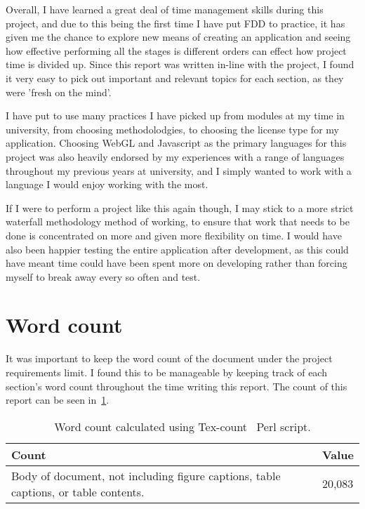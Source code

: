 Overall, I have learned a great deal of time management skills during this project, and due to this being the first time I have put FDD to practice, it has given me the chance to explore new means of creating an application and seeing how effective performing all the stages is different orders can effect how project time is divided up. Since this report was written in-line with the project, I found it very easy to pick out important and relevant topics for each section, as they were 'fresh on the mind'.

I have put to use many practices I have picked up from modules at my time in university, from choosing methodolodgies, to choosing the license type for my application. Choosing WebGL and Javascript as the primary languages for this project was also heavily endorsed by my experiences with a range of languages throughout my previous years at university, and I simply wanted to work with a language I would enjoy working with the most.

If I were to perform a project like this again though, I may stick to a more strict waterfall methodology method of working, to ensure that work that needs to be done is concentrated on more and given more flexibility on time. I would have also been happier testing the entire application after development, as this could have meant time could have been spent more on developing rather than forcing myself to break away every so often and test.

\section{Word count}
It was important to keep the word count of the document under the project requirements limit. I found this to be manageable by keeping track of each section's word count throughout the time writing this report. The count of this report can be seen in~\ref{tbl:count}.

\begin{table}[h!]
	\caption{Word count calculated using Tex-count~\cite{count} Perl script.}
	\begin{tabular}{|l|l|}
		\hline
		\textbf{Count} & \textbf{Value}                                                                \\ \hline
		Body of document, not including figure captions, table captions, or table contents.   &  20,083\\ \hline
	\end{tabular}
	\label{tbl:count}
\end{table}

